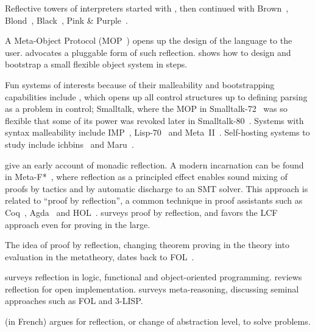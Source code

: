 Reflective towers of interpreters started with \cite{smith-lisp}, then continued with Brown~\citep{brown}, Blond~\citep{blond}, Black~\citep{black,black-gpce}, Pink \& Purple~\citep{collapsing-towers}.

A Meta-Object Protocol (MOP~\citep{Kiczales93metaobjectprotocols}) opens
up the design of the language to the user. \cite{bracha-mirrors}
advocates a pluggable form of such reflection. \cite{oeom} shows how
to design and bootstrap a small flexible object system in steps.

Fun systems of interests because of their malleability and
bootstrapping capabilities include \cite{fisher1970control}, which
opens up all control structures up to defining parsing as a problem in
control; Smalltalk, where the MOP in Smalltalk-72~\citep{smalltalk-72} was so flexible that
some of its power was revoked later in Smalltalk-80~\citep{smalltalk-80}.
Systems with
syntax malleability include IMP~\citep{imp},
Lisp-70~\citep{testerlisp70}
and Meta~II~\citep{meta2}. Self-hosting systems to
study include ichbins~\citep{ichbins} and Maru~\citep{maru}.

\cite{sobel} give an early account of monadic reflection. A modern
incarnation can be found in Meta-F*~\citep{meta-fstar}, where
reflection as a principled effect enables sound mixing of proofs by
tactics and by automatic discharge to an SMT solver. This approach is
related to ``proof by reflection'', a common technique in proof
assistants such as Coq~\citep{coq-reflection,coq-reflection2},
Agda~\citep{agda-reflection,agda-stump,agda-reflection-eng} and HOL~\citep{hol-reflection}. \cite{harrison-reflection} surveys proof by reflection, and favors the LCF approach even for proving in the large.

The idea of proof by reflection, changing theorem proving in the theory into evaluation in the metatheory, dates back to FOL~\citep{weyhrauch1980prolegomena}.

\cite{malenfant} surveys reflection in logic, functional and object-oriented programming. \cite{tanter} reviews reflection for open implementation.
\cite{costantini2002meta} surveys meta-reasoning, discussing seminal approaches such as FOL and 3-LISP.

\cite{metaconnaissances} (in French) argues for reflection, or change
of abstraction level, to solve problems.

